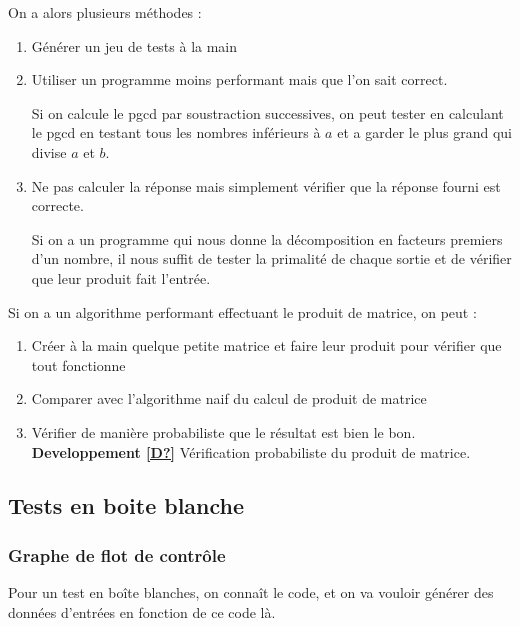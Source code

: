 \noindent On a alors plusieurs méthodes : \begin{enumerate}
	\item Générer un jeu de tests à la main
	\item Utiliser un programme moins performant mais que l'on sait correct.
	\begin{example}
		Si on calcule le pgcd par soustraction successives, on peut tester en calculant le pgcd en testant tous les nombres inférieurs à $a$ et a garder le plus grand qui divise $a$ et $b$.
	\end{example}
	\item Ne pas calculer la réponse mais simplement vérifier que la réponse fourni est correcte.
	\begin{example}
		Si on a un programme qui nous donne la décomposition en facteurs premiers d'un nombre, il nous suffit de tester la primalité de chaque sortie et de vérifier que leur produit fait l'entrée.
	\end{example}
\end{enumerate}

\begin{example}
	Si on a un algorithme performant effectuant le produit de matrice, on peut : \begin{enumerate}
		\item Créer à la main quelque petite matrice et faire leur produit pour vérifier que tout fonctionne
		\item Comparer avec l'algorithme naif du calcul de produit de matrice
		\item Vérifier de manière probabiliste que le résultat est bien le bon.\\
		\textbf{Developpement \ref{D?}} Vérification probabiliste du produit de matrice.
	\end{enumerate}
\end{example}

\subsection{Tests en boite blanche}

\subsubsection{Graphe de flot de contrôle}

Pour un test en boîte blanches, on connaît le code, et on va vouloir générer des données d'entrées en fonction de ce code là.\\

